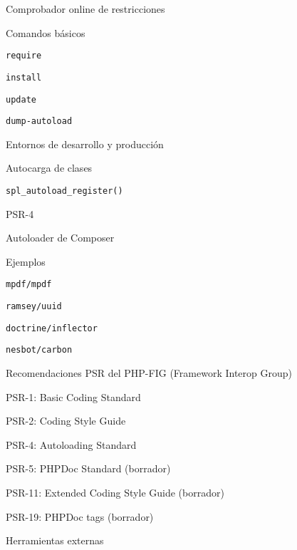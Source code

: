 \begin{longenum}
\begin{longenum}
\begin{longenum}
\begin{longenum}
                \item Comprobador online de restricciones
            \end{longenum}
            \item Comandos básicos
            \begin{longenum}
                \item \texttt{require}
                \item \texttt{install}
                \item \texttt{update}
                \item \texttt{dump-autoload}
            \end{longenum}
            \item Entornos de desarrollo y producción
        \end{longenum}
        \item Autocarga de clases
        \begin{longenum}
            \item \texttt{spl\_autoload\_register()}
            \item PSR-4
            \item Autoloader de Composer
        \end{longenum}
        \item Ejemplos
        \begin{longenum}
            \item \texttt{mpdf/mpdf}
            \item \texttt{ramsey/uuid}
            \item \texttt{doctrine/inflector}
            \item \texttt{nesbot/carbon}
        \end{longenum}
        \item Recomendaciones PSR del PHP-FIG (Framework Interop Group)
        \begin{longenum}
            \item PSR-1: Basic Coding Standard
            \item PSR-2: Coding Style Guide
            \item PSR-4: Autoloading Standard
            \item PSR-5: PHPDoc Standard (borrador)
            \item PSR-11: Extended Coding Style Guide (borrador)
            \item PSR-19: PHPDoc tags (borrador)
        \end{longenum}
        \item Herramientas externas \opcional\

\end{longenum}
\end{longenum}
